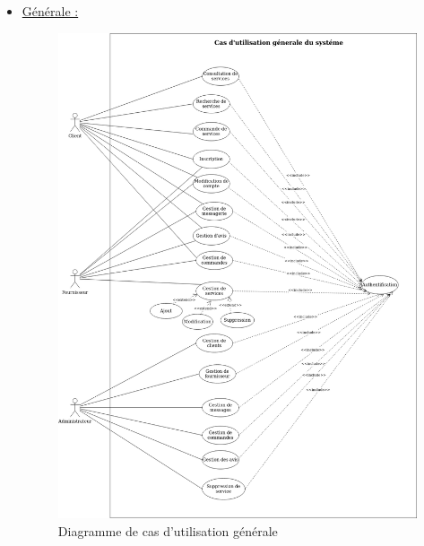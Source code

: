 \documentclass[french]{report}
\begin{document}
\begin{itemize}
    \item \underline{Générale :}
        \begin{figure}[H]
            \centering
            \includegraphics[width=1\textwidth]{images/Use cas general.drawio.png}
            \caption{Diagramme de cas d'utilisation générale}
            \label{Use case diag}
        \end{figure}
        

\end{itemize}
\end{document}
